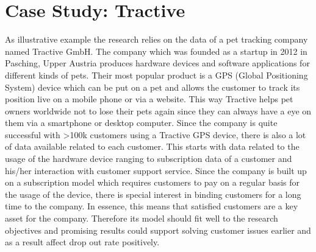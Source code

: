 \section{Case Study: Tractive}
\label{sec:illustrationExample}
As illustrative example the research relies on the data of a pet tracking company named Tractive GmbH. The company which was founded as a startup in 2012 in Pasching, Upper Austria produces hardware devices and software applications for different kinds of pets. Their most popular product is a GPS (Global Positioning System) device which can be put on a pet and allows the customer to track its position live on a mobile phone or via a website. This way Tractive helps pet owners worldwide not to lose their pets again since they can always have a eye on them via a smartphone or desktop computer. Since the company is quite successful with >100k customers using a Tractive GPS device, there is also a lot of data available related to each customer. This starts with data related to the usage of the hardware device ranging to subscription data of a customer and his/her interaction with customer support service. Since the company is built up on a subscription model which requires customers to pay on a regular basis for the usage of the device, there is special interest in binding customers for a long time to the company. In essence, this means that satisfied customers are a key asset for the company. Therefore its model should fit well to the research objectives and promising results could support solving customer issues earlier and as a result affect drop out rate positively. 

